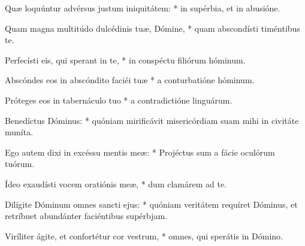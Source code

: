\begin{psalmus}
Quæ loquúntur advérsus justum iniquitátem: * in supérbia, et in abusióne.

Quam magna multitúdo dulcédinis tuæ, Dómine, * quam abscondísti timéntibus te.

Perfecísti eis, qui sperant in te, * in conspéctu filiórum hóminum.

Abscóndes eos in abscóndito faciéi tuæ * a conturbatióne hóminum.

Próteges eos in tabernáculo tuo * a contradictióne linguárum.

Benedíctus Dóminus: * quóniam mirificávit misericórdiam suam mihi in civitáte muníta.

Ego autem dixi in excéssu mentis meæ: * Projéctus sum a fácie oculórum tuórum.

Ídeo exaudísti vocem oratiónis meæ, * dum clamárem ad te.

Dilígite Dóminum omnes sancti ejus: * quóniam veritátem requíret Dóminus, et retríbuet abundánter faciéntibus supérbjam.

Viríliter ágite, et confortétur cor vestrum, * omnes, qui sperátis in Dómino.

\end{psalmus}
